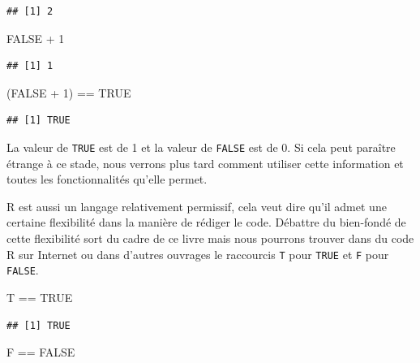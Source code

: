 \documentclass[twoside,symmetric]{book}
\newenvironment{Shaded}{}{}
\newcommand{\DecValTok}[1]{#1}
\newcommand{\NormalTok}[1]{#1}
\newcommand{\OperatorTok}[1]{#1}
\newcommand{\OtherTok}[1]{#1}
\newcommand{\StringTok}[1]{#1}
\begin{document}
\begin{verbatim}
## [1] 2
\end{verbatim}

\begin{Shaded}
\begin{Highlighting}[]
\OtherTok{FALSE} \OperatorTok{+}\StringTok{ }\DecValTok{1}
\end{Highlighting}
\end{Shaded}

\begin{verbatim}
## [1] 1
\end{verbatim}

\begin{Shaded}
\begin{Highlighting}[]
\NormalTok{(}\OtherTok{FALSE} \OperatorTok{+}\StringTok{ }\DecValTok{1}\NormalTok{) }\OperatorTok{==}\StringTok{ }\OtherTok{TRUE}
\end{Highlighting}
\end{Shaded}

\begin{verbatim}
## [1] TRUE
\end{verbatim}

La valeur de \texttt{TRUE} est de 1 et la valeur de \texttt{FALSE} est de 0. Si cela peut paraître étrange à ce stade, nous verrons plus tard comment utiliser cette information et toutes les fonctionnalités qu'elle permet.

R est aussi un langage relativement permissif, cela veut dire qu'il admet une certaine flexibilité dans la manière de rédiger le code. Débattre du bien-fondé de cette flexibilité sort du cadre de ce livre mais nous pourrons trouver dans du code R sur Internet ou dans d'autres ouvrages le raccourcis \texttt{T} pour \texttt{TRUE} et \texttt{F} pour \texttt{FALSE}.

\begin{Shaded}
\begin{Highlighting}[]
\NormalTok{T }\OperatorTok{==}\StringTok{ }\OtherTok{TRUE}
\end{Highlighting}
\end{Shaded}

\begin{verbatim}
## [1] TRUE
\end{verbatim}

\begin{Shaded}
\begin{Highlighting}[]
\NormalTok{F }\OperatorTok{==}\StringTok{ }\OtherTok{FALSE}
\end{Highlighting}
\end{Shaded}
\end{document}
